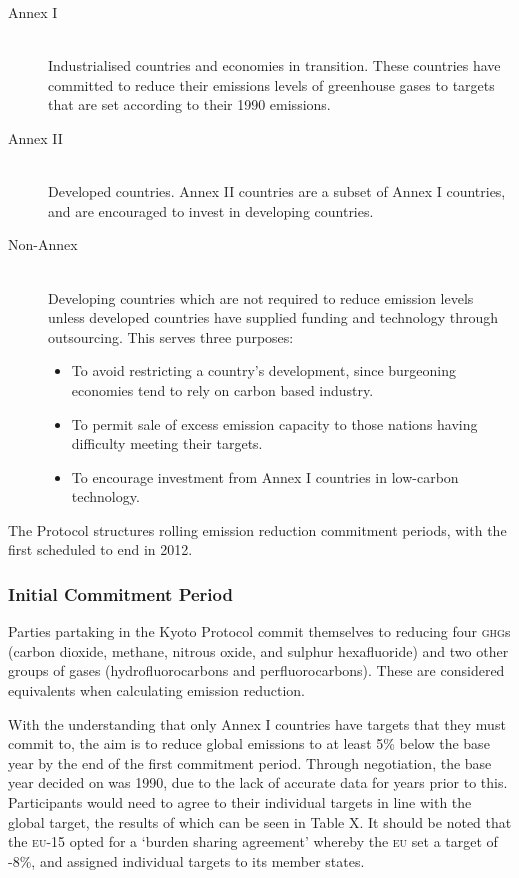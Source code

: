 \begin{description}
	\item[Annex I] \hfill \\
	Industrialised countries and economies in transition. These countries have committed to reduce their emissions levels of greenhouse gases to targets that are set according to their 1990 emissions.
	
	\item[Annex II] \hfill \\
	Developed countries. Annex II countries are a subset of Annex I countries, and are encouraged to invest in developing countries.

	\item[Non-Annex] \hfill \\
	Developing countries which are not required to reduce emission levels unless developed countries have supplied funding and technology through outsourcing. This serves three purposes:
	\begin{itemize}
		\item To avoid restricting a country's development, since burgeoning economies tend to rely on carbon based industry.
		\item To permit sale of excess emission capacity to those nations having difficulty meeting their targets.
		\item To encourage investment from Annex I countries in low-carbon technology.
	\end{itemize}
\end{description}

The Protocol structures rolling emission reduction commitment periods, with the first scheduled to end in 2012.

\subsubsection{Initial Commitment Period}

Parties partaking in the Kyoto Protocol commit themselves to reducing four \textsc{ghg}s (carbon dioxide, methane, nitrous oxide, and sulphur hexafluoride) and two other groups of gases (hydrofluorocarbons and perfluorocarbons). These are considered \CO equivalents when calculating emission reduction.

With the understanding that only Annex I countries have targets that they must commit to, the aim is to reduce global \CO emissions to at least 5\% below the base year by the end of the first commitment period. Through negotiation, the base year decided on was 1990, due to the lack of accurate data for years prior to this. Participants would need to agree to their individual targets in line with the global target, the results of which can be seen in Table X. It should be noted that the \textsc{eu}-15 opted for a `burden sharing agreement' whereby the \textsc{eu} set a target of -8\%, and assigned individual targets to its member states.

